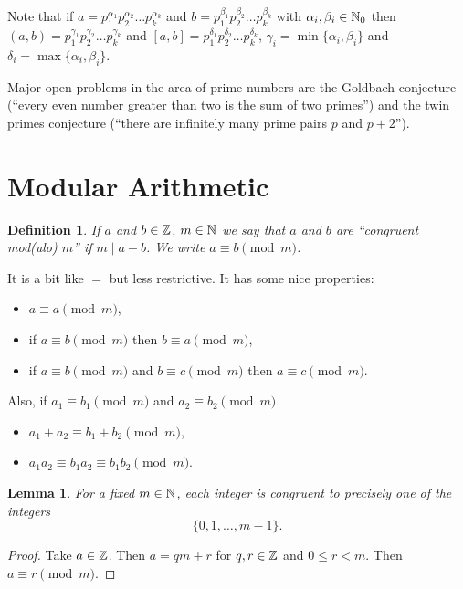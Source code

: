 \documentclass{notes}
\theoremstyle{plain}
\newtheorem*{definition}{Definition}
\newtheorem{lemma}{Lemma}[chapter]
\begin{document}
Note that if $a = p_1^{\alpha_1} p_2^{\alpha_2} \dots p_k^{\alpha_k}$ and
$b = p_1^{\beta_1} p_2^{\beta_2} \dots p_k^{\beta_k}$ with $\alpha_i,
\beta_i \in \mathbb{N}_0$ then $(a,b) = p_1^{\gamma_1} p_2^{\gamma_2} \dots
p_k^{\gamma_k}$ and $[a,b] = p_1^{\delta_1} p_2^{\delta_2} \dots
p_k^{\delta_k}$, $\gamma_i = \min \{\alpha_i, \beta_i\}$ and
$\delta_i = \max \{ \alpha_i, \beta_i \}$.

Major open problems in the area of prime numbers are the Goldbach
conjecture (``every even number greater than two is the sum of two primes'')
and the twin primes conjecture (``there are infinitely many prime pairs
$p$ and $p+2$'').

\section{Modular Arithmetic}

\begin{definition}
If $a$ and $b \in \mathbb{Z}$, $m \in \mathbb{N}$ we say that $a$ and $b$ are
``congruent mod(ulo) $m$'' if $m \mid a - b$.  We write
$a \equiv b \pmod{m}$.
\end{definition}

It is a bit like $=$ but less restrictive.  It has some nice properties:
\begin{itemize}
\item $a \equiv a \pmod{m}$,
\item if $a \equiv b \pmod{m}$ then $b \equiv a \pmod{m}$,
\item if $a \equiv b \pmod{m}$ and $b \equiv c \pmod{m}$ then
$a \equiv c \pmod{m}$.
\end{itemize}

Also, if $a_1 \equiv b_1 \pmod{m}$ and $a_2 \equiv b_2 \pmod{m}$
\begin{itemize}
\item $a_1 + a_2 \equiv b_1 + b_2 \pmod{m}$,
\item $a_1 a_2 \equiv b_1 a_2 \equiv b_1 b_2 \pmod{m}$.
\end{itemize}

\begin{lemma}
For a fixed $m \in \mathbb{N}$, each integer is congruent to precisely
one of the integers
\[
\{0, 1, \dots, m-1 \}.
\]
\end{lemma}

\begin{proof}
Take $a \in \mathbb{Z}$.  Then $a = q m + r$ for $q,r \in \mathbb{Z}$ and $0 \le r < m$.
Then $a \equiv r \pmod{m}$.
\end{proof}
\end{document}
